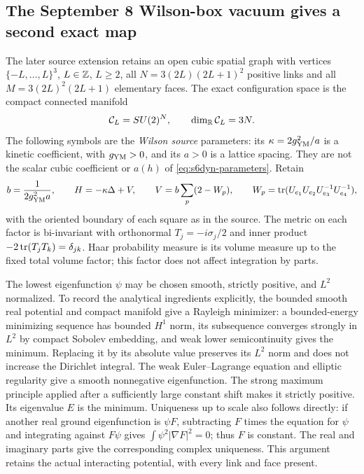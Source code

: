 \subsection{The September 8 Wilson-box vacuum gives a second exact map}

The later source extension
 retains an open cubic spatial
graph with vertices $\{-L,\ldots,L\}^3$, $L\in\mathbb Z$, $L\ge2$, all
$N=3(2L)(2L+1)^2$ positive links and all $M=3(2L)^2(2L+1)$ elementary
faces. The exact configuration space is the compact connected manifold
\[
 \mathcal C_L=SU(2)^N,
 \qquad\dim_{\mathbb R}\mathcal C_L=3N.
\]
The following symbols are the \emph{Wilson source} parameters: its
$\kappa=2g_{\rm YM}^2/a$ is a kinetic coefficient, with $g_{\rm YM}>0$,
and its $a>0$ is a
lattice spacing. They are not the scalar cubic coefficient or $a(h)$
of \eqref{eq:s6dyn-parameters}. Retain
\[
 b=\frac1{2g_{\rm YM}^2a},\qquad
 H=-\kappa\Delta+V,\qquad
 V=b\sum_p(2-W_p),\qquad
 W_p=\operatorname{tr}(U_{e_1}U_{e_2}U_{e_3}^{-1}U_{e_4}^{-1}),
\]
with the oriented boundary of each square as in the source. The metric
on each factor is bi-invariant with orthonormal
$T_j=-i\sigma_j/2$ and inner product $-2\operatorname{tr}(T_jT_k)=\delta_{jk}$.
Haar probability measure is its volume measure up to the fixed total
volume factor; this factor does not affect integration by parts.

The lowest eigenfunction $\psi$ may be chosen smooth, strictly positive,
and $L^2$ normalized. To record the analytical ingredients explicitly,
the bounded smooth real potential and compact manifold give a Rayleigh
minimizer: a bounded-energy minimizing sequence has bounded $H^1$ norm,
its subsequence converges strongly in $L^2$ by compact Sobolev embedding,
and weak lower semicontinuity gives the minimum. Replacing it by its
absolute value preserves its $L^2$ norm and does not increase the
Dirichlet integral. The weak Euler--Lagrange equation and elliptic
regularity give a smooth nonnegative eigenfunction. The strong maximum
principle applied after a sufficiently large constant shift makes it
strictly positive. Its eigenvalue $E$ is the minimum. Uniqueness up to
scale also follows directly: if another real ground eigenfunction is
$\psi F$, subtracting $F$ times the equation for $\psi$ and integrating
against $F\psi$ gives $\int\psi^2|\nabla F|^2=0$; thus $F$ is constant.
The real and imaginary parts give the corresponding complex uniqueness.
This argument retains the actual interacting potential, with every link
and face present.

